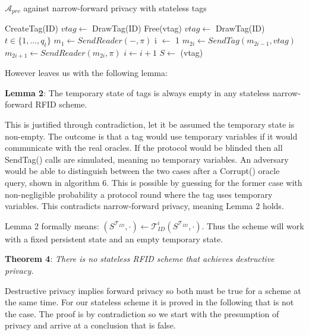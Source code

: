     \begin{algorithm}[H] %
        \centering
        \caption{$\mathcal{A}_{prv}$ against narrow-forward privacy with stateless tags}
        \begin{algorithmic}[1] %
            \State CreateTag(ID)
            \State $vtag \leftarrow$ DrawTag(ID)
            \State Free(vtag)  
            \State $vtag \leftarrow$ DrawTag(ID)
            \State $t \in \{1, ..., q_t\}$
            \State $m_1 \leftarrow SendReader(-,\pi)$ 
            \State i $\leftarrow$ 1
                \State $m_{2i} \gets SendTag(m_{2i-1}, vtag)$ 
                \State $m_{2i+1} \gets SendReader(m_{2i}, \pi)$
                \State $i \gets i+1$
            \EndWhile
            \State $S \gets$ (vtag)
                \State {}
            \EndIf
        \end{algorithmic}
    \end{algorithm}

    However \cite{Impossibility_results} leaves us with the following lemma:

    \textbf{Lemma 2}: The temporary state of tags is always empty in any stateless narrow-forward RFID scheme. 

    This is justified through contradiction, let it be assumed the temporary state is non-empty. The outcome is that a tag would use temporary 
    variables if it would communicate with the real oracles. If the protocol would be blinded then all SendTag() calls are simulated, 
    meaning no temporary variables. An adversary would be able to distinguish between the two cases after a Corrupt() oracle query, 
    shown in algorithm 6. This is possible by guessing for the former case with non-negligible probability a protocol round where the
    tag uses temporary variables. This contradicts narrow-forward privacy, meaning Lemma 2 holds.

    Lemma 2 formally means: $(S^{\mathcal{T}_{ID}}, \cdot) \gets \mathcal{T}_{ID}^i(S^{\mathcal{T}_{ID}}, \cdot)$. Thus the scheme will 
    work with a fixed persistent state and an empty temporary state.
    
    \textbf{Theorem 4}: \textit{There is no stateless RFID scheme that achieves destructive privacy.}
    
    Destructive privacy implies forward privacy so both must be true for a scheme at the same time. For our stateless scheme it is proved in the following
    that is not the case. The proof is by contradiction so we start with the presumption of privacy and arrive at a conclusion that is false.

